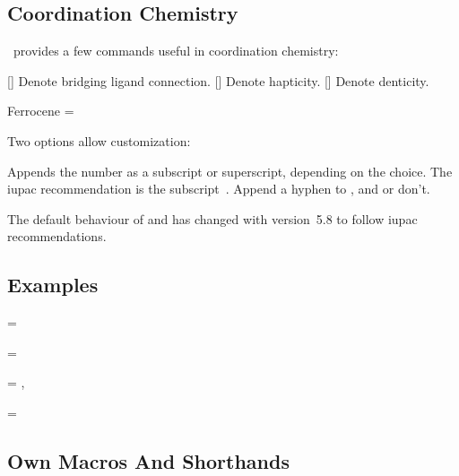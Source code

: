 \documentclass{chemmacros-manual}
\begin{document}
\subsection{Coordination Chemistry}

\chemmacros\ provides a few commands useful in coordination chemistry:
\begin{commands}
  [\quad{}]
    Denote bridging ligand connection.
  [\quad{}]
    Denote hapticity.
  [\quad{}]
    Denote denticity.
\end{commands}
\begin{example}
  Ferrocene =  \par
\end{example}

Two options allow customization:
\begin{options}
    Appends the number as a subscript or superscript, depending on the choice.
    The \ac{iupac} recommendation is the subscript~\cite{iupac:redbook}.
    Append a hyphen to ,  and  or don't.
\end{options}

The default behaviour of  and  has
changed with version~5.8 to follow \ac{iupac} recommendations.

\subsection{Examples}
\begin{example}
   =
   \par
   =
   \par
   =
  , \par
   \par
   =
\end{example}

\subsection{Own  Macros And Shorthands}
\end{document}
